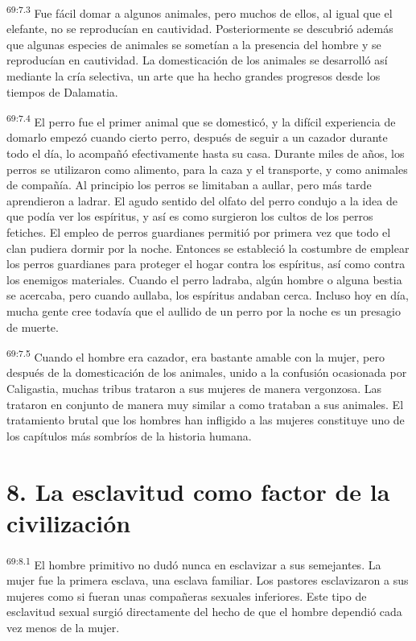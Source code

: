 \par
\textsuperscript{69:7.3} Fue fácil domar a algunos animales, pero muchos de ellos, al igual que el elefante, no se reproducían en cautividad. Posteriormente se descubrió además que algunas especies de animales se sometían a la presencia del hombre y se reproducían en cautividad. La domesticación de los animales se desarrolló así mediante la cría selectiva, un arte que ha hecho grandes progresos desde los tiempos de Dalamatia.

\par
\textsuperscript{69:7.4} El perro fue el primer animal que se domesticó, y la difícil experiencia de domarlo empezó cuando cierto perro, después de seguir a un cazador durante todo el día, lo acompañó efectivamente hasta su casa. Durante miles de años, los perros se utilizaron como alimento, para la caza y el transporte, y como animales de compañía. Al principio los perros se limitaban a aullar, pero más tarde aprendieron a ladrar. El agudo sentido del olfato del perro condujo a la idea de que podía ver los espíritus, y así es como surgieron los cultos de los perros fetiches. El empleo de perros guardianes permitió por primera vez que todo el clan pudiera dormir por la noche. Entonces se estableció la costumbre de emplear los perros guardianes para proteger el hogar contra los espíritus, así como contra los enemigos materiales. Cuando el perro ladraba, algún hombre o alguna bestia se acercaba, pero cuando aullaba, los espíritus andaban cerca. Incluso hoy en día, mucha gente cree todavía que el aullido de un perro por la noche es un presagio de muerte.

\par
\textsuperscript{69:7.5} Cuando el hombre era cazador, era bastante amable con la mujer, pero después de la domesticación de los animales, unido a la confusión ocasionada por Caligastia, muchas tribus trataron a sus mujeres de manera vergonzosa. Las trataron en conjunto de manera muy similar a como trataban a sus animales. El tratamiento brutal que los hombres han infligido a las mujeres constituye uno de los capítulos más sombríos de la historia humana.

\section*{8. La esclavitud como factor de la civilización}
\par
\textsuperscript{69:8.1} El hombre primitivo no dudó nunca en esclavizar a sus semejantes. La mujer fue la primera esclava, una esclava familiar. Los pastores esclavizaron a sus mujeres como si fueran unas compañeras sexuales inferiores. Este tipo de esclavitud sexual surgió directamente del hecho de que el hombre dependió cada vez menos de la mujer.

